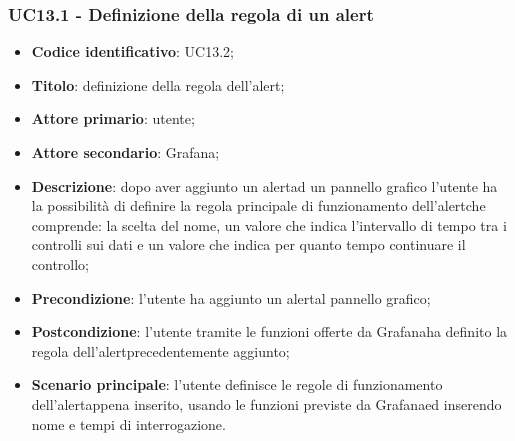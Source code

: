 \subsubsection{UC13.1 - Definizione della regola di un alert}
\begin{itemize}
	\item \textbf{Codice identificativo}: UC13.2;
	\item \textbf{Titolo}: definizione della regola dell'alert\glo;
	\item \textbf{Attore primario}: utente;
	\item \textbf{Attore secondario}: Grafana\glo;
	\item \textbf{Descrizione}: dopo aver aggiunto un alert\glosp ad un pannello grafico l'utente ha la possibilità di definire la regola principale di funzionamento dell'alert\glosp che comprende: la scelta del nome, un valore che indica l'intervallo di tempo tra i controlli sui dati e un valore che indica per quanto tempo continuare il controllo;
	\item \textbf{Precondizione}: l'utente ha aggiunto un alert\glosp al pannello grafico;
	\item \textbf{Postcondizione}: l'utente tramite le funzioni offerte da Grafana\glosp ha definito la regola dell'alert\glosp precedentemente aggiunto;
	\item \textbf{Scenario principale}: l'utente definisce le regole di funzionamento dell'alert\glosp appena inserito, usando le funzioni previste da Grafana\glosp ed inserendo nome e tempi di interrogazione.
\end{itemize}

